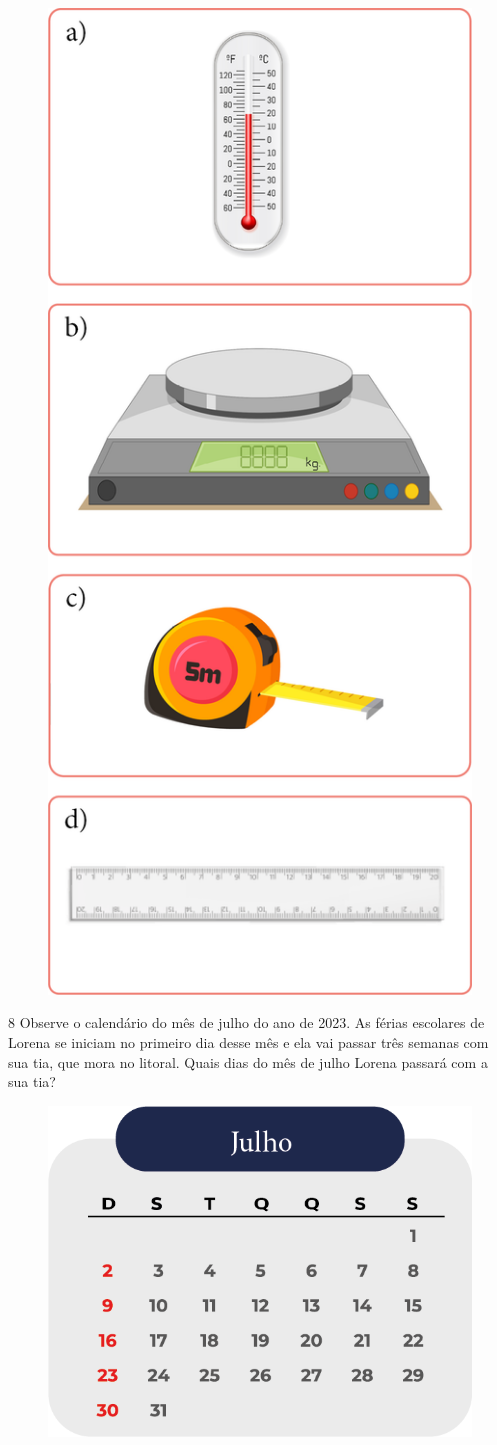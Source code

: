 \begin{figure}[H]
\includegraphics[width=.45\textwidth]{./media/image128.png}
\end{figure}


\num{8} Observe o calendário do mês de julho do ano de 2023. As férias escolares
de Lorena se iniciam no primeiro dia desse mês e ela vai passar três
semanas com sua tia, que mora no litoral. Quais dias do mês de julho
Lorena passará com a sua tia?

\begin{figure}[H]
\centering
\includegraphics[width=.8\textwidth]{./media/image130.png}
\end{figure}

